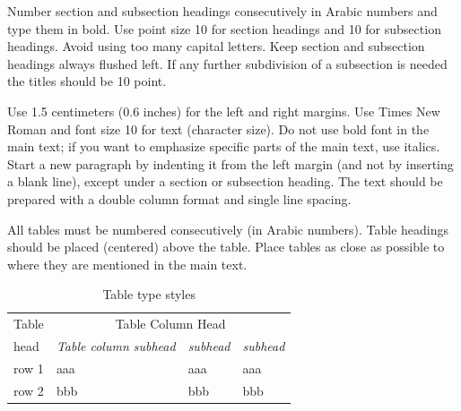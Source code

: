 \documentclass[a4paper, times, 10pt,twocolumn]{article}
\begin{document}

Number section and subsection headings consecutively in Arabic numbers and type them in bold. Use point size 10 for section headings and 10 for subsection headings. Avoid using too many capital letters. Keep section and subsection headings always flushed left. If any further subdivision of a subsection is needed the titles should be 10 point.


Use 1.5 centimeters (0.6 inches) for the left and right margins. Use Times New Roman and font size 10 for text (character size). Do not use bold font in the main text; if you want to emphasize specific parts of the main text, use italics. Start a new paragraph by indenting it from the left margin (and not by inserting a blank line), except under a section or subsection heading. The text should be prepared with a double column format and single line spacing.


All tables must be numbered consecutively (in Arabic numbers). Table headings should be placed (centered) above the table. Place tables as close as possible to where they are mentioned in the main text. 
\begin{table}[h]
\footnotesize
\centering
\caption{Table type styles}
\begin{tabular}{p{1cm}p{3cm}p{1.5cm}p{1.5cm}}
\hline
Table &\multicolumn{3}{c}{Table Column Head}\\ \cline{2-4}
head & \emph{Table column subhead} & \emph{subhead} & \emph{subhead}\\ \hline
row 1 & aaa & aaa & aaa \\
row 2 & bbb & bbb & bbb \\
\hline
\end{tabular}
\end{table}

\end{document}
